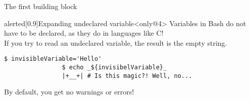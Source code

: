 \begin{frame}[fragile]{The first building block}
\begin{overlayarea}{\textwidth}{0.3\textheight}
        \begin{varblock}{alerted}[0.9\textwidth]{Expanding undeclared variable}<only@4>
            Variables in Bash do not have to be declared, as they do in languages like C!\\
            If you try to read an undeclared variable, the result is the empty string.\\
            \begin{lstlisting}[style=MyBash, numbers=none, belowskip=-5mm, xleftmargin=20mm, xrightmargin=20mm]
                $ invisibleVariable='Hello'
                $ echo _${invisibelVariable}_
                |+__+| # Is this magic?! Well, no...
            \end{lstlisting}
            \alert{By default, you get no warnings or errors!}
        \end{varblock}
    \end{overlayarea}
\end{frame}
